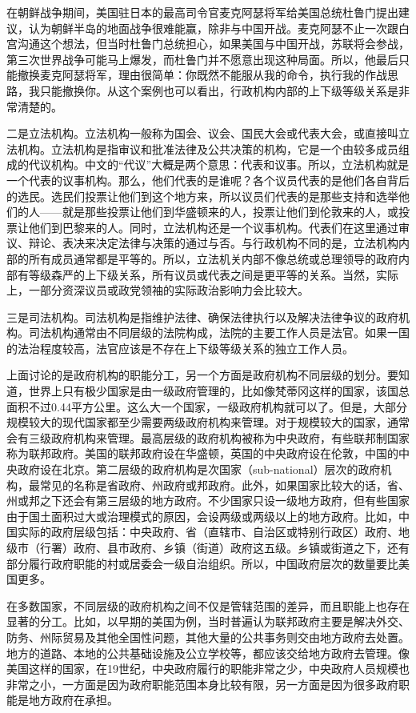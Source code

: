 在朝鲜战争期间，美国驻日本的最高司令官麦克阿瑟将军给美国总统杜鲁门提出建议，认为朝鲜半岛的地面战争很难能赢，除非与中国开战。麦克阿瑟不止一次跟白宫沟通这个想法，但当时杜鲁门总统担心，如果美国与中国开战，苏联将会参战，第三次世界战争可能马上爆发，而杜鲁门并不愿意出现这种局面。所以，他最后只能撤换麦克阿瑟将军，理由很简单：你既然不能服从我的命令，执行我的作战思路，我只能撤换你。从这个案例也可以看出，行政机构内部的上下级等级关系是非常清楚的。

二是立法机构。立法机构一般称为国会、议会、国民大会或代表大会，或直接叫立法机构。立法机构是指审议和批准法律及公共决策的机构，它是一个由较多成员组成的代议机构。中文的“代议”大概是两个意思：代表和议事。所以，立法机构就是一个代表的议事机构。那么，他们代表的是谁呢？各个议员代表的是他们各自背后的选民。选民们投票让他们到这个地方来，所以议员们代表的是那些支持和选举他们的人——就是那些投票让他们到华盛顿来的人，投票让他们到伦敦来的人，或投票让他们到巴黎来的人。同时，立法机构还是一个议事机构。代表们在这里通过审议、辩论、表决来决定法律与决策的通过与否。与行政机构不同的是，立法机构内部的所有成员通常都是平等的。所以，立法机关内部不像总统或总理领导的政府内部有等级森严的上下级关系，所有议员或代表之间是更平等的关系。当然，实际上，一部分资深议员或政党领袖的实际政治影响力会比较大。

三是司法机构。司法机构是指维护法律、确保法律执行以及解决法律争议的政府机构。司法机构通常由不同层级的法院构成，法院的主要工作人员是法官。如果一国的法治程度较高，法官应该是不存在上下级等级关系的独立工作人员。

上面讨论的是政府机构的职能分工，另一个方面是政府机构不同层级的划分。要知道，世界上只有极少国家是由一级政府管理的，比如像梵蒂冈这样的国家，该国总面积不过0.44平方公里。这么大一个国家，一级政府机构就可以了。但是，大部分规模较大的现代国家都至少需要两级政府机构来管理。对于规模较大的国家，通常会有三级政府机构来管理。最高层级的政府机构被称为中央政府，有些联邦制国家称为联邦政府。美国的联邦政府设在华盛顿，英国的中央政府设在伦敦，中国的中央政府设在北京。第二层级的政府机构是次国家（sub-national）层次的政府机构，最常见的名称是省政府、州政府或邦政府。此外，如果国家比较大的话，省、州或邦之下还会有第三层级的地方政府。不少国家只设一级地方政府，但有些国家由于国土面积过大或治理模式的原因，会设两级或两级以上的地方政府。比如，中国实际的政府层级包括：中央政府、省（直辖市、自治区或特别行政区）政府、地级市（行署）政府、县市政府、乡镇（街道）政府这五级。乡镇或街道之下，还有部分履行政府职能的村或居委会一级自治组织。所以，中国政府层次的数量要比美国更多。

在多数国家，不同层级的政府机构之间不仅是管辖范围的差异，而且职能上也存在显著的分工。比如，以早期的美国为例，当时普遍认为联邦政府主要是解决外交、防务、州际贸易及其他全国性问题，其他大量的公共事务则交由地方政府去处置。地方的道路、本地的公共基础设施及公立学校等，都应该交给地方政府去管理。像美国这样的国家，在19世纪，中央政府履行的职能非常之少，中央政府人员规模也非常之小，一方面是因为政府职能范围本身比较有限，另一方面是因为很多政府职能是地方政府在承担。

